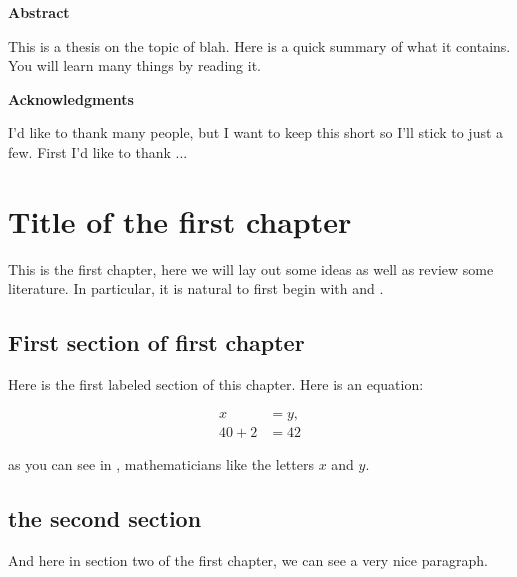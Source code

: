 \documentclass[12pt]{report}
\begin{document}
\newpage
\begin{center}
    \Large \textbf{Abstract}
\end{center}
This is a thesis on the topic of blah. Here is a quick summary of what it contains. You will learn many things by reading it.


\newpage
\tableofcontents
\listoftables
\listoffigures



\newpage
{}
\begin{center}
    \Large \textbf{Acknowledgments}
\end{center}
I'd like to thank many people, but I want to keep this short so I'll stick to just a few. First I'd like to thank ...






\newpage
\chapter{Title of the first chapter}

\setcounter{page}{1} %


This is the first chapter, here we will lay out some ideas as well as review some literature. In particular, it is natural to first begin with \citep{the10rules} and \citep{theBook}.


\section{First section of first chapter}
Here is the first labeled section of this chapter. Here is an equation:


\begin{subequations}
\label{the equation}
\begin{align}
x &= y,\\
40 + 2 &= 42
\end{align}
\end{subequations}

as you can see in \label{the equation}, mathematicians like the letters $x$ and $y$.


\section{the second section}

And here in section two of the first chapter, we can see a very nice paragraph.
\end{document}

